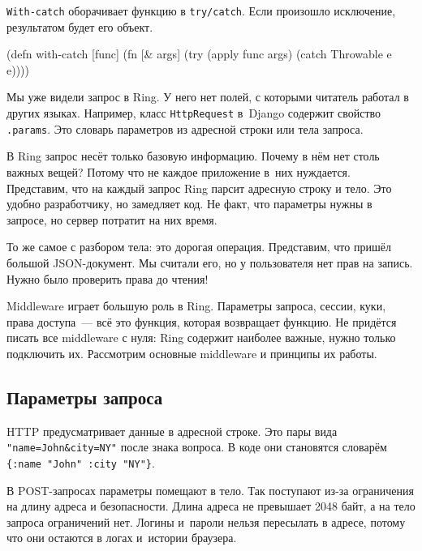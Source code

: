 
\mnoindent
\verb|With-catch| оборачивает функцию в \verb|try/catch|. Если произошло
исключение, результатом будет его объект.

\begin{english}
  \begin{clojure}
(defn with-catch [func]
  (fn [& args]
    (try
      (apply func args)
      (catch Throwable e
        e))))
  \end{clojure}
\end{english}


Мы уже видели запрос в Ring. У него нет полей, с которыми читатель работал в
других языках. Например, класс \verb|HttpRequest| в~Django содержит свойство
\verb|.params|. Это словарь параметров из адресной строки или тела запроса.

В Ring запрос несёт только базовую информацию. Почему в нём нет столь
важных вещей? Потому что не каждое приложение в~них нуждается. Представим, что
на каждый запрос Ring парсит адресную строку и тело. Это удобно разработчику, но
замедляет код. Не факт, что параметры нужны в запросе, но сервер потратит на них
время.

То же самое с разбором тела: это дорогая операция. Представим, что пришёл
большой JSON-документ. Мы считали его, но у пользователя нет прав на
запись. Нужно было проверить права до чтения!

Middleware играет большую роль в Ring. Параметры запроса, сессии, куки, права
доступа~--- всё это функция, которая возвращает функцию. Не придётся писать
все middleware с нуля: Ring содержит наиболее важные, нужно только подключить
их. Рассмотрим основные middleware и принципы их работы.

\subsection{Параметры запроса}

\label{ring-params}


HTTP предусматривает данные в адресной строке. Это пары вида
\verb|"name=John&city=NY"| после знака вопроса. В коде они становятся
словарём \verb|{:name "John" :city "NY"}|.

В POST-запросах параметры помещают в тело. Так поступают из-за ограничения на
длину адреса и безопасности. Длина адреса не превышает 2048 байт, а на тело
запроса ограничений нет. Логины и~пароли нельзя пересылать в адресе, потому что
они остаются в логах и~истории браузера.

